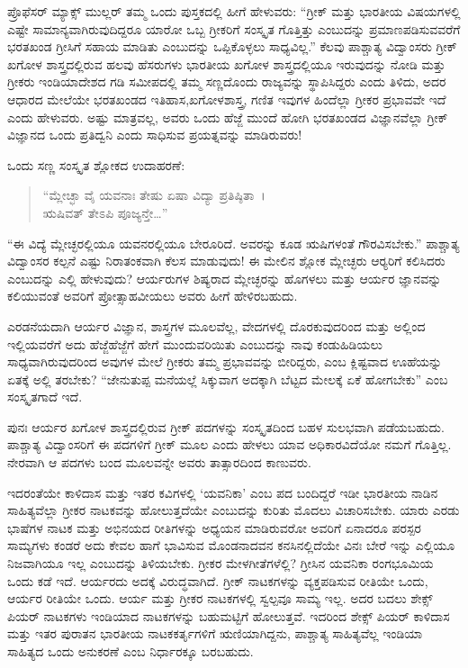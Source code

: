  ಪ್ರೊಫೆಸರ್ ಮ್ಯಾಕ್ಸ್ ಮುಲ್ಲರ್ ತಮ್ಮ ಒಂದು ಪುಸ್ತಕದಲ್ಲಿ ಹೀಗೆ ಹೇಳುವರು: “ಗ್ರೀಕ್ ಮತ್ತು ಭಾರತೀಯ ವಿಷಯಗಳಲ್ಲಿ ಎಷ್ಟೇ ಸಾಮಾನ್ಯವಾಗಿರುವುದಿದ್ದರೂ ಯಾರೋ ಒಬ್ಬ ಗ್ರೀಕರಿಗೆ ಸಂಸ್ಕೃತ ಗೊತ್ತಿತ್ತು ಎಂಬುದನ್ನು ಪ್ರಮಾಣಪಡಿಸುವವರೆಗೆ ಭರತಖಂಡ ಗ್ರೀಸಿಗೆ ಸಹಾಯ ಮಾಡಿತು ಎಂಬುದನ್ನು ಒಪ್ಪಿಕೊಳ್ಳಲು ಸಾಧ್ಯವಿಲ್ಲ.” ಕೆಲವು ಪಾಶ್ಚಾತ್ಯ ವಿದ್ವಾಂಸರು ಗ್ರೀಕ್ ಖಗೋಳ ಶಾಸ್ತ್ರದಲ್ಲಿರುವ ಹಲವು ಹೆಸರುಗಳು ಭಾರತೀಯ ಖಗೋಳ ಶಾಸ್ತ್ರದಲ್ಲಿಯೂ ಇರುವುದನ್ನು ನೋಡಿ ಮತ್ತು ಗ್ರೀಕರು ಇಂಡಿಯಾದೇಶದ ಗಡಿ ಸಮೀಪದಲ್ಲಿ ತಮ್ಮ ಸಣ್ಣದೊಂದು ರಾಜ್ಯವನ್ನು ಸ್ಥಾಪಿಸಿದ್ದರು ಎಂದು ತಿಳಿದು, ಅದರ ಆಧಾರದ ಮೇಲೆಯೇ ಭರತಖಂಡದ ಇತಿಹಾಸ,\break ಖಗೋಳಶಾಸ್ತ್ರ, ಗಣಿತ ಇವುಗಳ ಹಿಂದೆಲ್ಲಾ ಗ್ರೀಕರ ಪ್ರಭಾವವೇ ಇದೆ ಎಂದು ಹೇಳುವರು. ಅಷ್ಟು ಮಾತ್ರವಲ್ಲ, ಅವರು ಒಂದು ಹೆಜ್ಜೆ ಮುಂದೆ ಹೋಗಿ ಭರತಖಂಡದ ವಿಜ್ಞಾನವೆಲ್ಲಾ ಗ್ರೀಕ್ ವಿಜ್ಞಾನದ ಒಂದು ಪ್ರತಿದ್ವನಿ ಎಂದು ಸಾಧಿಸುವ ಪ್ರಯತ್ನವನ್ನು ಮಾಡಿರುವರು! 

 ಒಂದು ಸಣ್ಣ ಸಂಸ್ಕೃತ ಶ್ಲೋಕದ ಉದಾಹರಣೆ:

\begin{verse}
“ಮ್ಲೇಚ್ಛಾ ವೈ ಯವನಾಃ ತೇಷು ಏಷಾ ವಿದ್ಯಾ ಪ್ರತಿಷ್ಠಿತಾ~।\\ಋಷಿವತ್ ತೇಽಪಿ ಪೂಜ್ಯನ್ತೇ…” 
\end{verse}

 “ಈ ವಿದ್ಯೆ ಮ್ಲೇಚ್ಛರಲ್ಲಿಯೂ ಯವನರಲ್ಲಿಯೂ ಬೇರೂರಿದೆ. ಅವರನ್ನು ಕೂಡ ಋಷಿಗಳಂತೆ ಗೌರವಿಸಬೇಕು.” ಪಾಶ್ಚಾತ್ಯ ವಿದ್ವಾಂಸರ ಕಲ್ಪನೆ ಎಷ್ಟು ನಿರಾತಂಕವಾಗಿ ಕೆಲಸ ಮಾಡುವುದು! ಈ ಮೇಲಿನ ಶ್ಲೋಕ ಮ್ಲೇಚ್ಛರು ಆರ‍್ಯರಿಗೆ ಕಲಿಸಿದರು ಎಂಬುದನ್ನು ಎಲ್ಲಿ ಹೇಳುವುದು? ಆರ್ಯರುಗಳ ಶಿಷ್ಯರಾದ ಮ್ಲೇಚ್ಛರನ್ನು ಹೊಗಳಲು ಮತ್ತು ಆರ್ಯರ ಜ್ಞಾನವನ್ನು ಕಲಿಯುವಂತೆ ಅವರಿಗೆ ಪ್ರೋತ್ಸಾಹವೀಯಲು ಅವರು ಹೀಗೆ ಹೇಳಿರಬಹುದು. 

 ಎರಡನೆಯದಾಗಿ ಆರ್ಯರ ವಿಜ್ಞಾನ, ಶಾಸ್ತ್ರಗಳ ಮೂಲವೆಲ್ಲ, ವೇದಗಳಲ್ಲಿ ದೊರಕುವುದರಿಂದ ಮತ್ತು ಅಲ್ಲಿಂದ ಇಲ್ಲಿಯವರೆಗೆ ಅದು ಹೆಜ್ಜೆಹೆಜ್ಜೆಗೆ ಹೇಗೆ ಮುಂದುವರಿಯಿತು ಎಂಬುದನ್ನು ನಾವು ಕಂಡುಹಿಡಿಯಲು ಸಾಧ್ಯವಾಗಿರುವುದರಿಂದ ಅವುಗಳ ಮೇಲೆ ಗ್ರೀಕರು ತಮ್ಮ ಪ್ರಭಾವವನ್ನು ಬೀರಿದ್ದರು, ಎಂಬ ಕ್ಲಿಷ್ಟವಾದ ಊಹೆಯನ್ನು ಏತಕ್ಕೆ ಅಲ್ಲಿ ತರಬೇಕು? “ಜೇನುತುಪ್ಪ ಮನೆಯಲ್ಲೆ ಸಿಕ್ಕುವಾಗ ಅದಕ್ಕಾಗಿ ಬೆಟ್ಟದ ಮೇಲಕ್ಕೆ ಏಕೆ ಹೋಗಬೇಕು” ಎಂಬ ಸಂಸ್ಕೃತಗಾದೆ ಇದೆ. 

 ಪುನಃ ಆರ್ಯರ ಖಗೋಳ ಶಾಸ್ತ್ರದಲ್ಲಿರುವ ಗ್ರೀಕ್ ಪದಗಳನ್ನು ಸಂಸ್ಕೃತದಿಂದ ಬಹಳ ಸುಲಭವಾಗಿ ಪಡೆಯಬಹುದು. ಪಾಶ್ಚಾತ್ಯ ವಿದ್ವಾಂಸರಿಗೆ ಈ ಪದಗಳಿಗೆ ಗ್ರೀಕ್ ಮೂಲ ಎಂದು ಹೇಳಲು ಯಾವ ಅಧಿಕಾರವಿದೆಯೋ ನಮಗೆ ಗೊತ್ತಿಲ್ಲ. ನೇರವಾಗಿ ಆ ಪದಗಳು ಬಂದ ಮೂಲವನ್ನೇ ಅವರು ತಾತ್ಸಾರದಿಂದ ಕಾಣುವರು. 

 ಇದರಂತೆಯೇ ಕಾಳಿದಾಸ ಮತ್ತು ಇತರ ಕವಿಗಳಲ್ಲಿ ‘ಯವನಿಕಾ’ ಎಂಬ ಪದ ಬಂದಿದ್ದರೆ ಇಡೀ ಭಾರತೀಯ ನಾಡಿನ ಸಾಹಿತ್ಯವೆಲ್ಲಾ ಗ್ರೀಕರ ನಾಟಕವನ್ನು ಹೋಲುತ್ತದೆಯೇ ಎಂಬುದನ್ನು ಕುರಿತು ಮೊದಲು ವಿಚಾರಿಸಬೇಕು. ಯಾರು ಎರಡು ಭಾಷೆಗಳ ನಾಟಕ ಮತ್ತು ಅಭಿನಯದ ರೀತಿಗಳನ್ನು ಅಧ್ಯಯನ ಮಾಡಿರುವರೋ ಅವರಿಗೆ ಏನಾದರೂ ಪರಸ್ಪರ ಸಾಮ್ಯಗಳು ಕಂಡರೆ ಅದು ಕೇವಲ ಹಾಗೆ ಭಾವಿಸುವ ಮೊಂಡನಾದವನ ಕನಸಿನಲ್ಲಿದೆಯೇ ವಿನಃ ಬೇರೆ ಇನ್ನು ಎಲ್ಲಿಯೂ ನಿಜವಾಗಿಯೂ ಇಲ್ಲ ಎಂಬುದನ್ನು ತಿಳಿಯಬೇಕು. ಗ್ರೀಕರ ಮೇಳಗೀತೆಗಳೆಲ್ಲಿ? ಗ್ರೀಸಿನ ಯವನಿಕಾ ರಂಗಭೂಮಿಯ ಒಂದು ಕಡೆ ಇದೆ. ಆರ್ಯರದು ಅದಕ್ಕೆ ವಿರುದ್ಧವಾಗಿದೆ. ಗ್ರೀಕ್ ನಾಟಕಗಳನ್ನು ವ್ಯಕ್ತಪಡಿಸುವ ರೀತಿಯೇ ಒಂದು, ಆರ್ಯರ ರೀತಿಯೇ ಒಂದು. ಆರ್ಯ ಮತ್ತು ಗ್ರೀಕರ ನಾಟಕಗಳಲ್ಲಿ ಸ್ವಲ್ಪವೂ ಸಾಮ್ಯ ಇಲ್ಲ. ಅದರ ಬದಲು ಶೇಕ್ಸ್​ಪಿಯರ್ ನಾಟಕಗಳು ಇಂಡಿಯಾದ ನಾಟಕಗಳನ್ನು ಬಹುಮಟ್ಟಿಗೆ ಹೋಲುತ್ತವೆ. ಇದರಿಂದ ಶೇಕ್ಸ್ ಪಿಯರ್ ಕಾಳಿದಾಸ ಮತ್ತು ಇತರ ಪುರಾತನ ಭಾರತೀಯ ನಾಟಕಕರ್ತೃಗಳಿಗೆ ಋಣಿಯಾಗಿದ್ದನು, ಪಾಶ್ಚಾತ್ಯ ಸಾಹಿತ್ಯವೆಲ್ಲ ಇಂಡಿಯಾ ಸಾಹಿತ್ಯದ ಒಂದು ಅನುಕರಣೆ ಎಂಬ ನಿರ್ಧಾರಕ್ಕೂ ಬರಬಹುದು. 

